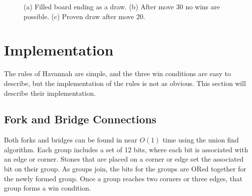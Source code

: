 \begin{figure}
	\centering
	\subfloat[]{\label{fig:drawproven}
		\begin{HavannahBoard}[board size=4,coordinate style=classical,show coordinates=false]
		\HGame{g7,a1,f5,g4,e3,d2,e2,d1,c2,d3,c3,f7,d6,b4,a4,b5,a3,e5,c4,b3}%
		\end{HavannahBoard}
	}
	\caption[Havannah Draws]{(a) Filled board ending as a draw. (b) After move 30 no wins are possible. (c) Proven draw after move 20.}
	\label{fig:draw}
\end{figure}




\section{Implementation}

The rules of Havannah are simple, and the three win conditions are easy to describe, but the implementation of the rules is not as obvious. This section will describe their implementation.

\subsection{Fork and Bridge Connections}

Both forks and bridges can be found in near $O(1)$ time using the union find algorithm. Each group includes a set of 12 bits, where each bit is associated with an edge or corner. Stones that are placed on a corner or edge set the associated bit on their group. As groups join, the bits for the groups are ORed together for the newly formed group. Once a group reaches two corners or three edges, that group forms a win condition.

